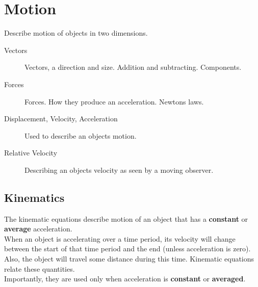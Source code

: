 \documentclass[11pt,a4paper]{article}
\begin{document}
\section{Motion}
Describe motion of objects in two dimensions.

\begin{description}
	\item[Vectors] Vectors, a direction and size. Addition and subtracting. Components.
	\item[Forces] Forces. How they produce an acceleration. Newtons laws.
	\item[Displacement, Velocity, Acceleration] Used to describe an objects motion.
	\item[Relative Velocity] Describing an objects velocity as seen by a moving observer. 
\end{description}

\subsection{Kinematics}
The kinematic equations describe motion of an object that has a \textbf{constant} or \textbf{average} acceleration. \\


When an object is accelerating over a time period, its velocity will change between the start of that time period and
the end (unless acceleration is zero). Also, the object will travel some distance during this time. Kinematic
equations relate these quantities. \\

\reversemarginpar 
{}
\normalmarginpar
Importantly, they are used only when acceleration is \textbf{constant} or \textbf{averaged}.
\end{document}
